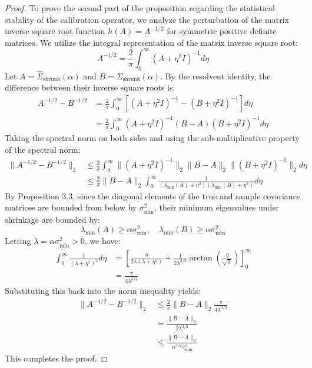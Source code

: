 \documentclass{article}
\theoremstyle{plain}
\theoremstyle{definition}
\theoremstyle{remark}
\begin{document}
\begin{proof}
To prove the second part of the proposition regarding the statistical stability of the calibration operator, we analyze the perturbation of the matrix inverse square root function $h(A) = A^{-1/2}$ for symmetric positive definite matrices. We utilize the integral representation of the matrix inverse square root:
\begin{equation*}
  A^{-1/2} = \frac{2}{\pi} \int_0^\infty (A + \eta^2 I)^{-1} d\eta
\end{equation*}
Let $A = \hat{\Sigma}_{\text{shrunk}}(\alpha)$ and $B = \Sigma_{\text{shrunk}}(\alpha)$. By the resolvent identity, the difference between their inverse square roots is:
\begin{align*}
  A^{-1/2} - B^{-1/2} &= \frac{2}{\pi} \int_0^\infty \left[ (A + \eta^2 I)^{-1} - (B + \eta^2 I)^{-1} \right] d\eta \\
  &= \frac{2}{\pi} \int_0^\infty (A + \eta^2 I)^{-1} (B - A) (B + \eta^2 I)^{-1} d\eta
\end{align*}
Taking the spectral norm on both sides and using the sub-multiplicative property of the spectral norm:
\begin{align*}
  \| A^{-1/2} - B^{-1/2} \|_2 &\leq \frac{2}{\pi} \int_0^\infty \| (A + \eta^2 I)^{-1} \|_2 \| B - A \|_2 \| (B + \eta^2 I)^{-1} \|_2 d\eta \\
  &\leq \frac{2}{\pi} \| B - A \|_2 \int_0^\infty \frac{1}{\left(\lambda_{\min}(A) + \eta^2\right) \left(\lambda_{\min}(B) + \eta^2\right)} d\eta
\end{align*}
By Proposition 3.3, since the diagonal elements of the true and sample covariance matrices are bounded from below by $\sigma_{\min}^2$, their minimum eigenvalues under shrinkage are bounded by:
\begin{equation*}
  \lambda_{\min}(A) \geq \alpha \sigma_{\min}^2, \quad \lambda_{\min}(B) \geq \alpha \sigma_{\min}^2
\end{equation*}
Letting $\lambda = \alpha \sigma_{\min}^2 > 0$, we have:
\begin{align*}
  \int_0^\infty \frac{1}{\left(\lambda + \eta^2\right)^2} d\eta &= \left[ \frac{\eta}{2\lambda(\lambda + \eta^2)} + \frac{1}{2\lambda^{3/2}} \arctan\left(\frac{\eta}{\sqrt{\lambda}}\right) \right]_0^\infty \\
  &= \frac{\pi}{4\lambda^{3/2}}
\end{align*}
Substituting this back into the norm inequality yields:
\begin{align*}
  \| A^{-1/2} - B^{-1/2} \|_2 &\leq \frac{2}{\pi} \| B - A \|_2 \frac{\pi}{4\lambda^{3/2}} \\
  &= \frac{\| B - A \|_2}{2\lambda^{3/2}} \\
  &\leq \frac{\| B - A \|_2}{\alpha^{3/2} \sigma_{\min}^3}
\end{align*}
This completes the proof.
\end{proof}
\end{document}
